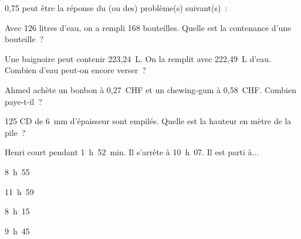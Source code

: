 \begin{QCM}
\begin{GroupeQCM}
    \begin{exercice}
      0,75 peut être la réponse du (ou des) problème(s) suivant(s) :
      \begin{ChoixQCM}{4}
      \item Avec 126 litres d'eau, on a rempli 168 bouteilles. Quelle est la contenance d'une bouteille ?
      \item Une baignoire peut contenir 223,24 L. On la remplit avec  222,49 L d'eau. Combien d'eau peut‑on encore verser ?
      \item Ahmed achète un bonbon à 0,27 CHF et un chewing‑gum à 0,58 CHF. Combien paye‑t‑il ?
      \item 125 CD de 6 mm d'épaisseur sont empilés. Quelle est la hauteur en mètre de la pile ?
      \end{ChoixQCM}
      \begin{corrige}
   \end{corrige}
    \end{exercice}
    
    \begin{exercice}
      Henri court pendant 1 h 52 min. Il s'arrête à 10 h 07. Il est parti à...
      \begin{ChoixQCM}{4}
      \item 8 h 55
      \item 11 h 59
      \item 8 h 15
      \item 9 h 45
      \end{ChoixQCM}
      \begin{corrige}
   \end{corrige}
    \end{exercice}

\end{GroupeQCM}
\end{QCM}

  